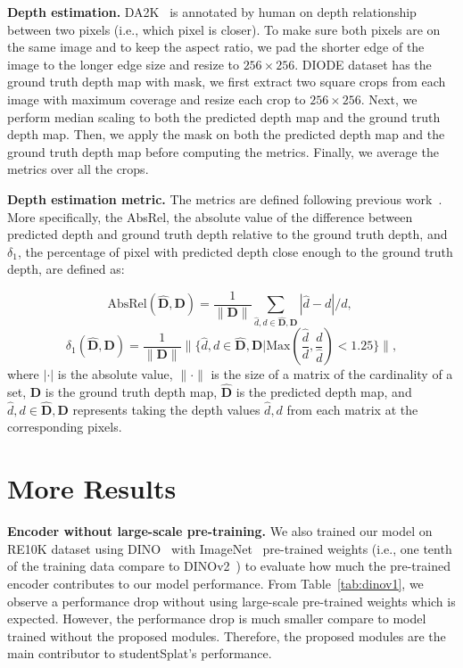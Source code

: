 \documentclass{article} %
\begin{document}
\textbf{Depth estimation.} DA2K~\citep{yang2024depth} is annotated by human on depth relationship between two pixels (i.e., which pixel is closer). To make sure both pixels are on the same image and to keep the aspect ratio, we pad the shorter edge of the image to the longer edge size and resize to $256 \times 256$. DIODE\citep{vasiljevic2019diode} dataset has the ground truth depth map with mask, we first extract two square crops from each image with maximum coverage and resize each crop to $256 \times 256$. Next, we perform median scaling to both the predicted depth map and the ground truth depth map. Then, we apply the mask on both the predicted depth map and the ground truth depth map before computing the metrics. Finally, we average the metrics over all the crops.

\textbf{Depth estimation metric.}
The metrics are defined following previous work~\citep{eigen2014depth}. More specifically, the AbsRel, the absolute value of the difference between predicted depth and ground truth depth relative to the ground truth depth, and $\delta_1$, the percentage of pixel with predicted depth close enough to the ground truth depth, are defined as:

\begin{equation}
    \mathrm{AbsRel}(\hat{\bm D},\bm D)=\frac{1}{\|\bm D\|}\sum_{\hat{d},d\in \hat{\bm D},\bm D}|\hat{d}-d|/d,\; 
\end{equation}
\begin{equation}
    \delta_1(\hat{\bm D},\bm D) = \frac{1}{\|\bm D\|}\|\{\hat{d},d\in \hat{\bm D},\bm D |\mathrm{Max}(\frac{\hat{d}}{d},\frac{d}{\hat{d}}) < 1.25\}\|,
\end{equation}
where $|\cdot|$ is the absolute value, $\|\cdot\|$ is the size of a matrix of the cardinality of a set, $\bm D$ is the ground truth depth map, $\hat{\bm D}$ is the predicted depth map, and $\hat{d},d\in \hat{\bm D},\bm D$ represents taking the depth values $\hat{d},d$ from each matrix at the corresponding pixels.

\section{More Results}
\label{sec:add_results}
\textbf{Encoder without large-scale pre-training.} We also trained our model on RE10K dataset using DINO~\citep{caron2021emerging} with ImageNet~\citep{russakovsky2015imagenet} pre-trained weights (i.e., one tenth of the training data compare to DINOv2~\citep{oquab2023dinov2}) to evaluate how much the pre-trained encoder contributes to our model performance. From Table~\ref{tab:dinov1}, we observe a performance drop without using large-scale pre-trained weights which is expected. However, the performance drop is much smaller compare to model trained without the proposed modules. Therefore, the proposed modules are the main contributor to studentSplat's performance.

\end{document}

